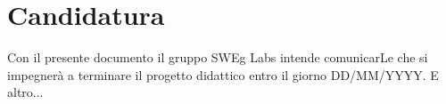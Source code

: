 \section{Candidatura}

Con il presente documento il gruppo SWEg Labs intende comunicarLe che si impegner\`a a terminare il progetto didattico entro il giorno DD/MM/YYYY.
E altro...